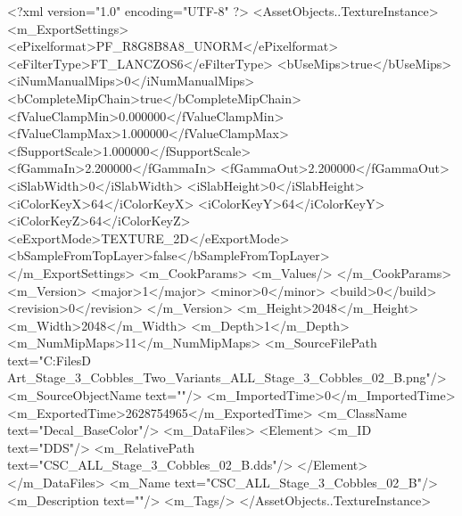 <?xml version="1.0" encoding="UTF-8" ?>
<AssetObjects..TextureInstance>
	<m_ExportSettings>
		<ePixelformat>PF_R8G8B8A8_UNORM</ePixelformat>
		<eFilterType>FT_LANCZOS6</eFilterType>
		<bUseMips>true</bUseMips>
		<iNumManualMips>0</iNumManualMips>
		<bCompleteMipChain>true</bCompleteMipChain>
		<fValueClampMin>0.000000</fValueClampMin>
		<fValueClampMax>1.000000</fValueClampMax>
		<fSupportScale>1.000000</fSupportScale>
		<fGammaIn>2.200000</fGammaIn>
		<fGammaOut>2.200000</fGammaOut>
		<iSlabWidth>0</iSlabWidth>
		<iSlabHeight>0</iSlabHeight>
		<iColorKeyX>64</iColorKeyX>
		<iColorKeyY>64</iColorKeyY>
		<iColorKeyZ>64</iColorKeyZ>
		<eExportMode>TEXTURE_2D</eExportMode>
		<bSampleFromTopLayer>false</bSampleFromTopLayer>
	</m_ExportSettings>
	<m_CookParams>
		<m_Values/>
	</m_CookParams>
	<m_Version>
		<major>1</major>
		<minor>0</minor>
		<build>0</build>
		<revision>0</revision>
	</m_Version>
	<m_Height>2048</m_Height>
	<m_Width>2048</m_Width>
	<m_Depth>1</m_Depth>
	<m_NumMipMaps>11</m_NumMipMaps>
	<m_SourceFilePath text="C:\Users\Shadow\Desktop\Working Files\3D Art\Decals\CSC_Stage_3_Cobbles_Two_Variants\rectangular\textures\CSC_ALL_Stage_3_Cobbles_02_B.png"/>
	<m_SourceObjectName text=""/>
	<m_ImportedTime>0</m_ImportedTime>
	<m_ExportedTime>2628754965</m_ExportedTime>
	<m_ClassName text="Decal_BaseColor"/>
	<m_DataFiles>
		<Element>
			<m_ID text="DDS"/>
			<m_RelativePath text="CSC_ALL_Stage_3_Cobbles_02_B.dds"/>
		</Element>
	</m_DataFiles>
	<m_Name text="CSC_ALL_Stage_3_Cobbles_02_B"/>
	<m_Description text=""/>
	<m_Tags/>
</AssetObjects..TextureInstance>
